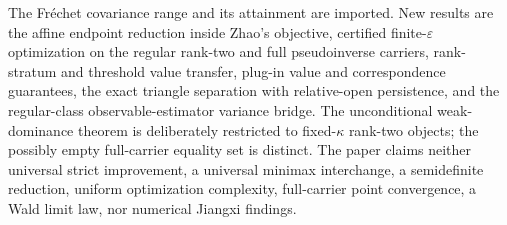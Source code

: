 The Fr\'echet covariance range and its attainment are imported.  New results are the affine endpoint reduction inside Zhao's objective, certified finite-\(\varepsilon\) optimization on the regular rank-two and full pseudoinverse carriers, rank-stratum and threshold value transfer, plug-in value and correspondence guarantees, the exact triangle separation with relative-open persistence, and the regular-class observable-estimator variance bridge.  The unconditional weak-dominance theorem is deliberately restricted to fixed-\(\kappa\) rank-two objects; the possibly empty full-carrier equality set is distinct.  The paper claims neither universal strict improvement, a universal minimax interchange, a semidefinite reduction, uniform optimization complexity, full-carrier point convergence, a Wald limit law, nor numerical Jiangxi findings.